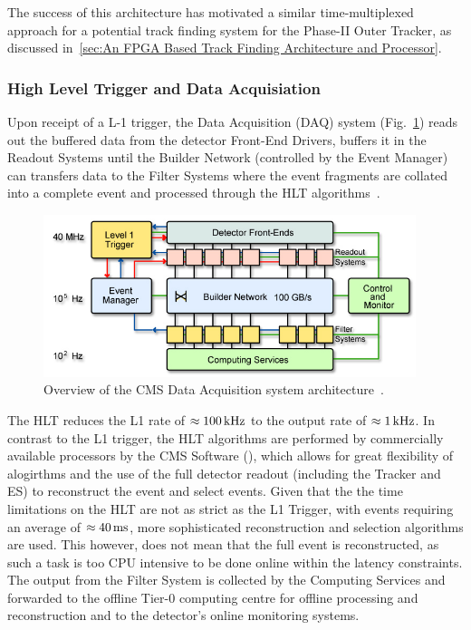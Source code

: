 The success of this architecture has motivated a similar time-multiplexed approach for a potential track finding system for the Phase-II Outer Tracker, as discussed in~\ref{sec:An FPGA Based Track Finding Architecture and Processor}.

\subsubsection{High Level Trigger and Data Acquisiation}\label{paragraph:HLT}
Upon receipt of a L-1 trigger, the Data Acquisition (DAQ) system (Fig.~\ref{fig:DAQ}) reads out the buffered data from the detector Front-End Drivers, buffers it in the Readout Systems until the Builder Network (controlled by the Event Manager) can transfers data to the Filter Systems where the event fragments are collated into a complete event and processed through the HLT algorithms~\cite{Sphicas:2002gg}. 

\begin{figure}[htbp]
\begin{center}
\includegraphics[width=0.97\textwidth]{figs/cms/CMS_DAQ.jpg}
\caption{Overview of the CMS Data Acquisition system architecture~\cite{Sphicas:2002gg}.}
\label{fig:DAQ}
\end{center}
\end{figure}

The HLT reduces the L1 rate of $\approx 100\text{\,kHz}$ to the output rate of $\approx 1\text{\,kHz}$.
In contrast to the L1 trigger, the HLT algorithms are performed by commercially available processors by the CMS Software (\CMSSW), which allows for great flexibility of alogirthms and the use of the full detector readout (including the Tracker and ES) to reconstruct the event and select events.
Given that the the time limitations on the HLT are not as strict as the L1 Trigger, with events requiring an average of $\approx 40\text{\,ms}$, more sophisticated reconstruction and selection algorithms are used.
This however, does not mean that the full event is reconstructed, as such a task is too CPU intensive to be done online within the latency constraints.
The output from the Filter System is collected by the Computing Services and forwarded to the offline Tier-0 computing centre for offline processing and reconstruction and to the detector's online monitoring systems.

